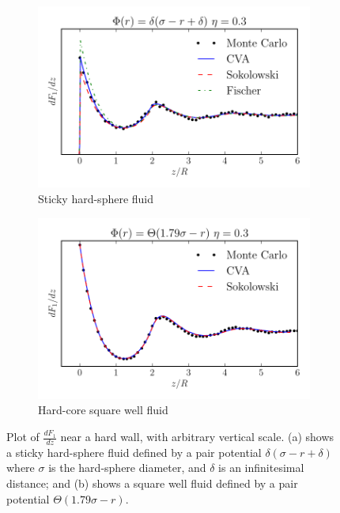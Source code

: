 \begin{figure}
  \begin{subfigure}{1.0\columnwidth}
    \includegraphics[width=\columnwidth]{figs/dadz-3-2.pdf}
    \vspace{-0.8cm}
    \caption{Sticky hard-sphere fluid}\label{fig:dadz-delta}
  \end{subfigure}
  \begin{subfigure}{1.0\columnwidth}
    \includegraphics[width=\columnwidth]{figs/dadz-square-well-3.pdf}
    \vspace{-0.8cm}
    \caption{Hard-core square well fluid}\label{fig:dadz-square-well}
  \end{subfigure}
  \caption{Plot of $\frac{dF_1}{dz}$ near a hard wall, with arbitrary
    vertical scale.  (a) shows a
    sticky hard-sphere fluid defined by a pair potential
    $\delta(\sigma-r+\delta)$ where $\sigma$ is the hard-sphere
    diameter, and $\delta$ is an infinitesimal distance; and (b) shows a
    square well fluid defined by a pair potential $\Theta(1.79
    \sigma-r)$.
  }
  \label{fig:dadz}
\end{figure}

